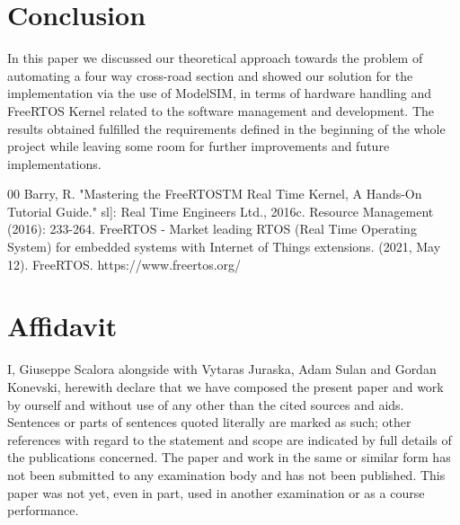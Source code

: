 \documentclass[conference]{IEEEtran}
\begin{document}
\section{Conclusion}
In this paper we discussed our theoretical approach towards the problem of automating a four way cross-road section and showed our solution for the implementation via the use of ModelSIM, in terms of hardware handling and FreeRTOS Kernel related to the software management and development. The results obtained fulfilled the requirements defined in the beginning of the whole project while leaving some room for further improvements and future implementations.

\begin{thebibliography} {00}
 Barry, R. "Mastering the FreeRTOSTM Real Time Kernel, A Hands-On Tutorial Guide." sl]: Real Time Engineers Ltd., 2016c. Resource Management (2016): 233-264.
 FreeRTOS - Market leading RTOS (Real Time Operating System) for embedded systems with Internet of Things extensions. (2021, May 12). FreeRTOS. https://www.freertos.org/
\end{thebibliography}



\section{Affidavit}
I, Giuseppe Scalora alongside with Vytaras Juraska, Adam Sulan and Gordan Konevski, herewith declare that we have composed the present paper and work by ourself and without use of any other than the cited sources and aids. Sentences or parts of sentences quoted literally are marked as such; other references with regard to the statement and scope are indicated by full details of the publications concerned. The paper and work in the same or similar form has not been submitted to any examination body and has not been published. This paper was not yet, even in part, used in another examination or as a course performance.
\end{document}
